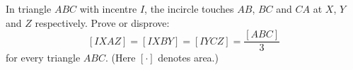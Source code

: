 In triangle $ABC$ with incentre $I$, the incircle touches $AB$, $BC$ and $CA$ at $X$, $Y$ and $Z$ respectively. Prove or disprove:
\[
[IXAZ]=[IXBY]=[IYCZ]=\dfrac{[ABC]}{3}
\]
for every triangle $ABC$. (Here $[\cdot]$ denotes area.)
